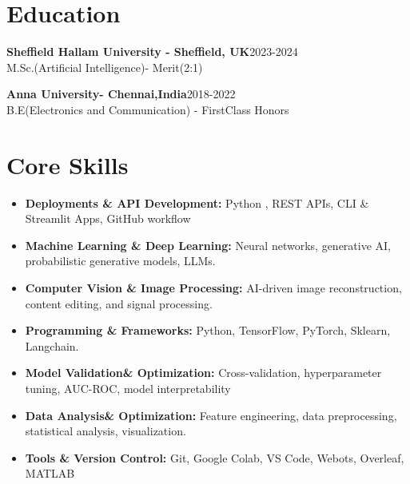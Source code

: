 \documentclass[10 pt, letterpaper]{article}
\begin{document}
\section*{Education}
\textbf{Sheffield Hallam University - Sheffield, UK}\hfill{2023-2024} \\ M.Sc.(Artificial Intelligence)- Merit(2:1)  

\textbf{Anna University- Chennai,India}\hfill{2018-2022} \\B.E(Electronics and Communication) - FirstClass Honors  
\vspace{-0.3cm}
\section*{Core Skills}

\begin{itemize}
    \item \textbf{Deployments \& API Development:} Python , REST APIs, CLI \& Streamlit Apps, GitHub workflow
    \vspace{-0.23cm}
    \item \textbf{Machine Learning \& Deep Learning:} Neural networks, generative AI, probabilistic generative models, LLMs.
    \vspace{-0.23cm}
    \item \textbf{Computer Vision \& Image Processing:} AI-driven image reconstruction, content editing, and signal processing.
    \vspace{-0.23cm}
    \item \textbf{Programming \& Frameworks:} Python, TensorFlow, PyTorch, Sklearn, Langchain.
    \vspace{-0.23cm}
    \item \textbf{Model Validation\& Optimization:} Cross-validation, hyperparameter tuning, AUC-ROC, model interpretability
       \vspace{-0.23cm}
    \item \textbf{Data Analysis\& Optimization:} Feature engineering, data preprocessing, statistical analysis, visualization.
    \vspace{-0.23cm}
    \item \textbf{Tools \& Version Control:} Git, Google Colab, VS Code, Webots, Overleaf, MATLAB

\end{itemize}
\end{document}
